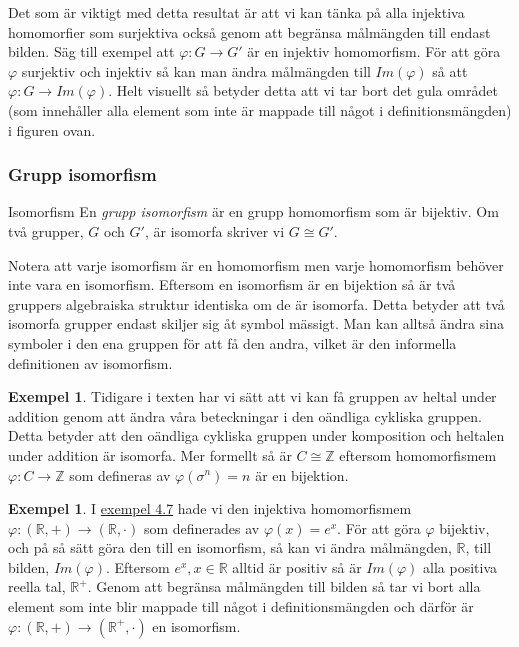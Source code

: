 \documentclass{article}
\theoremstyle{definition}
\newtheorem{exmp}[thm]{Exempel}
\begin{document}
Det som är viktigt med detta resultat är att vi kan tänka på alla injektiva homomorfier som
surjektiva också genom att begränsa målmängden till endast bilden. Säg till exempel att 
$\varphi : G \rightarrow G'$ är en injektiv homomorfism. För att göra $\varphi$ surjektiv och injektiv 
så kan man ändra målmängden till $Im(\varphi)$ så att $\varphi : G \rightarrow Im(\varphi)$.
Helt visuellt så betyder detta att vi tar bort det gula området 
(som innehåller alla element som inte är mappade till något i definitionsmängden) i figuren ovan.



\subsubsection{Grupp isomorfism}
\begin{mydef}{Isomorfism}{}
  En \textit{grupp isomorfism} är en grupp homomorfism som är bijektiv. 
  Om två grupper, $G$ och $G'$, är 
  isomorfa skriver vi $G \cong G'$.
\end{mydef}
Notera att varje isomorfism är en homomorfism men 
varje homomorfism behöver inte vara en isomorfism. 
Eftersom en isomorfism är en bijektion så är två gruppers algebraiska struktur identiska 
om de är isomorfa. Detta betyder att två isomorfa grupper endast skiljer sig åt symbol mässigt. 
Man kan alltså ändra sina symboler i den ena gruppen för att få den andra, vilket är den informella 
definitionen av isomorfism.


\begin{exmp}
Tidigare i texten har vi sätt att vi kan få gruppen av heltal under addition genom att 
ändra våra beteckningar i den oändliga cykliska gruppen. Detta betyder att 
den oändliga cykliska gruppen under komposition och heltalen under addition är isomorfa.
Mer formellt så är $C \cong \mathbb{Z}$ eftersom homomorfismem
$\varphi: C \rightarrow \mathbb{Z}$ 
som defineras av 
$\varphi (\sigma^n) = n$
är en bijektion.
\end{exmp}

\begin{exmp}
  I \hyperlink{exmp4.7}{exempel 4.7} hade vi den injektiva homomorfismem 
  \linebreak
  $\varphi : (\mathbb{R}, +) \rightarrow (\mathbb{R}, \cdot)$ som definerades av 
  $\varphi(x) = e^x.$ För att göra $\varphi$ bijektiv, och på så sätt göra den till en isomorfism, 
  så kan 
  vi ändra målmängden, $\mathbb{R}$, till bilden, $Im(\varphi)$. Eftersom $e^x, x \in \mathbb{R}$
  alltid är positiv så är $Im(\varphi)$ alla positiva reella tal, $\mathbb{R}^+.$
  Genom att begränsa målmängden till bilden så tar vi bort alla element som inte blir 
  mappade till något i definitionsmängden och därför är 
  $\varphi : (\mathbb{R}, +) \rightarrow (\mathbb{R}^+, \cdot)$ en isomorfism. 
\end{exmp}
\end{document}
